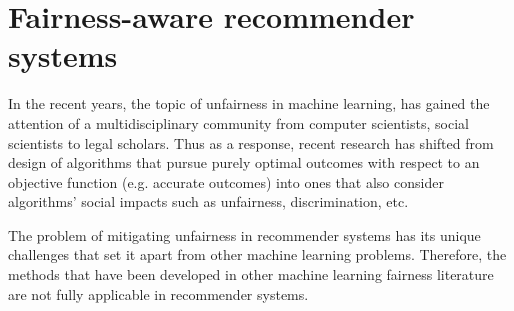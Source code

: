     
    
    
    

\section{Fairness-aware recommender systems}

In the recent years, the topic of unfairness in machine learning, has gained the attention of a multidisciplinary community from computer scientists, social scientists to legal scholars. Thus as a response, recent research has shifted from design of algorithms that pursue purely optimal outcomes with respect to an objective function (e.g. accurate outcomes) into ones that also consider algorithms' social impacts such as unfairness, discrimination, etc.

The problem of mitigating unfairness in recommender systems has its unique challenges that set it apart from other machine learning problems. Therefore, the methods that have been developed in other machine learning fairness literature are not fully applicable in recommender systems.

